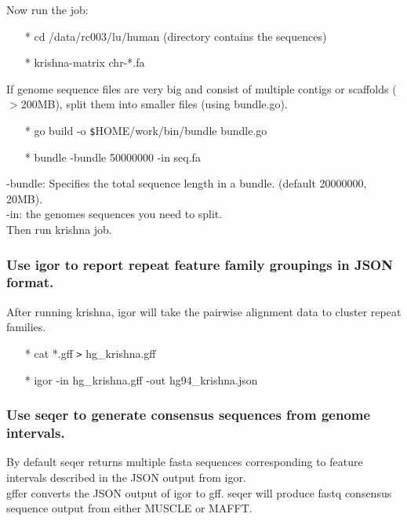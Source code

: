 \documentclass[12pt]{report}
\begin{document}
\noindent Now run the job:

\begin{enumerate}
	\item[*] cd /data/rc003/lu/human (directory contains the sequences)
	\item[*] krishna-matrix chr-*.fa
\end{enumerate}

\noindent If genome sequence files are very big and consist of multiple contigs or scaffolds ($>$200MB), split them into smaller files (using bundle.go).\\

\begin{enumerate}
	\item[*] go build -o \texttt{\$}HOME/work/bin/bundle bundle.go
	\item[*] bundle -bundle 50000000 -in seq.fa
\end{enumerate}

\noindent -bundle: Specifies the total sequence length in a bundle. (default 20000000, 20MB).\\
-in: the genomes sequences you need to split.\\
Then run krishna job.\\

\subsubsection*{Use igor to report repeat feature family groupings in JSON format.}

After running krishna, igor will take the pairwise alignment data to cluster repeat families.
\begin{enumerate}
	\item[*] cat *.gff \texttt{>} hg\_krishna.gff
	\item[*] igor -in hg\_krishna.gff -out hg94\_krishna.json
\end{enumerate}

\subsubsection*{Use seqer to generate consensus sequences from genome intervals.}
By default seqer returns multiple fasta sequences corresponding to feature intervals described in the JSON output from igor. \\

gffer converts the JSON output of igor to gff. seqer will produce fastq consensus sequence output from either MUSCLE or MAFFT. 
\end{document}

